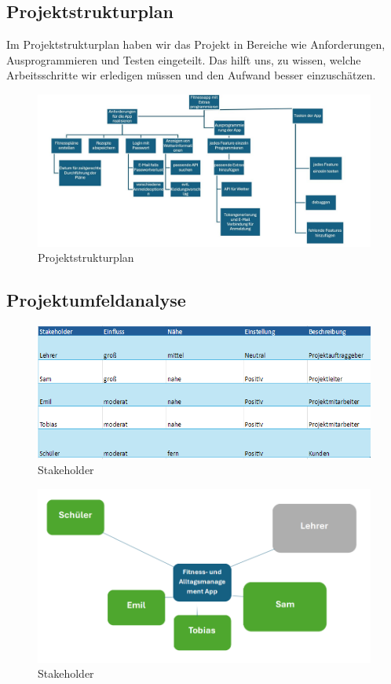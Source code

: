 \documentclass[ngerman]{report}
\begin{document}
\subsection{Projektstrukturplan}

Im Projektstrukturplan haben wir das Projekt in Bereiche wie
Anforderungen, Ausprogrammieren und Testen eingeteilt. Das hilft uns, zu
wissen, welche Arbeitsschritte wir erledigen müssen und den Aufwand
besser einzuschätzen.

\begin{figure}[H]
\centering
\includegraphics[width=0.8\linewidth]{projektstrukturplan.jpg}
\caption{Projektstrukturplan}
\end{figure}

\subsection{Projektumfeldanalyse}

\begin{figure}[H]
\centering
\includegraphics[width=0.8\linewidth]{img.png}
\caption{Stakeholder}
\end{figure}

\begin{figure}[H]
\centering
\includegraphics[width=0.8\linewidth]{img_1.png}
\caption{Stakeholder}
\end{figure}
\end{document}
